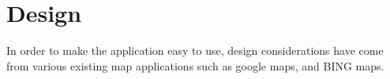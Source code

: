 \section{Design}
In order to make the application easy to use, design considerations have come from various existing map applications such as google maps, and BING maps. 
